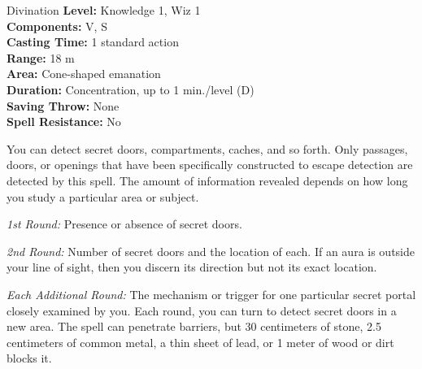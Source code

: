 {Divination}
{
	\textbf{Level:}
	Knowledge 1, Wiz 1\\
	\textbf{Components:}
	V, S\\
	\textbf{Casting Time:}
	1 standard action\\
	\textbf{Range:}
	18 m\\
	\textbf{Area:}
	Cone-shaped emanation\\
	\textbf{Duration:}
	Concentration, up to 1 min./level (D)\\
	\textbf{Saving Throw:}
	None\\
	\textbf{Spell Resistance:}
	No\\
}
{
	You can detect secret doors, compartments, caches, and so forth. Only passages, doors, or openings that have been specifically constructed to escape detection are detected by this spell. The amount of information revealed depends on how long you study a particular area or subject.

	\textit{1st Round:}
	Presence or absence of secret doors.

	\textit{2nd Round:}
	Number of secret doors and the location of each. If an aura is outside your line of sight, then you discern its direction but not its exact location.

	\textit{Each Additional Round:}
	The mechanism or trigger for one particular secret portal closely examined by you. Each round, you can turn to detect secret doors in a new area. The spell can penetrate barriers, but 30 centimeters of stone, 2.5 centimeters of common metal, a thin sheet of lead, or 1 meter of wood or dirt blocks it.

}
